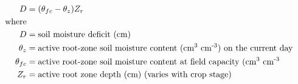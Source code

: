 \documentclass[fleqn, oneside, 11pt]{article}%
\begin{document}
\begin{preview}
\begin{align*}%
D & = (\theta_{fc}-\theta_{z})Z_{r} \\ 
\text{where} \nonumber \\
D & =  \text{soil moisture deficit (cm)} \nonumber \\
\theta_{z} & =  \text{active root-zone soil moisture content (cm\textsuperscript{3} cm\textsuperscript{-3}) on the current day} \nonumber \\
\theta_{fc} & =  \text{active root-zone soil moisture content at field capacity (cm\textsuperscript{3} cm\textsuperscript{-3}} \nonumber \\
Z_{r} & =  \text{active root zone depth (cm) (varies with crop stage)} \nonumber \\
\end{align*} 
\end{preview}
\end{document}
